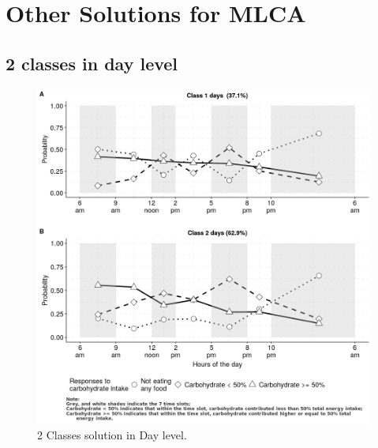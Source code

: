 
\chapter{Other Solutions for MLCA} %

\section{2 classes in day level}

\label{AppendixC} %

\begin{figure}[H]
	\centering
	\includegraphics{Figures/CW2level1.png}
	\decoRule
	\caption[2 Classes solution in Day level]{2 Classes solution in Day level.}
	\label{fig:diary1}
\end{figure}




